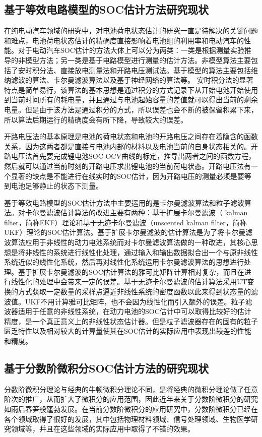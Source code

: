 	\subsection{基于等效电路模型的SOC估计方法研究现状}
	在纯电动汽车领域的研究中，对电池荷电状态估计的研究一直是待解决的关键问题和难点，电池荷电状态估计的精确度直接影响着电池组的利用率和电动汽车的性能。对于电动汽车SOC估计的方法大体上可以分为两类：一类是根据测量实验推导的非模型方法；另一类是基于电路模型进行测量的估计方法。非模型算法主要包括了安时积分法、直接放电测量法和开路电压测试法。基于模型的算法主要包括维纳滤波的算法、卡尔曼滤波算法以及基于神经网络的算法等。
安时积分法的显著特点是简单易行，该算法的基本思想是通过积分的方式记录下从开始电池开始使用到当前时间所有的耗电量，并且通过与电池起始容量的差值就可以得出当前的剩余电量。但是由于该方法是通过积分的方式，所以误差也会不断的被保留积累下来，所以算法后期运行的精确度会有所下降，导致较大的误差。

开路电压法的基本原理是电池的荷电状态和电池的开路电压之间存在着隐含的函数关系，因为这两者都是直接与电池内部的材料以及电池当前的自身状态相关的。开路电压法首先要完成锂电池SOC-OCV曲线的标定，推导出两者之间的函数方程，然后就可以通过当前时刻的开路电压求出锂电池的当前荷电状态。开路电压法有一个显著的缺点是不能进行在线实时的SOC估计，因为开路电压的测量必须是要等到电池足够静止的状态下测量。

	基于等效电路模型的SOC估计方法中主要运用的是卡尔曼滤波算法和粒子滤波算法。对卡尔曼滤波估计算法的改进主要有两种：基于扩展卡尔曼滤波（ kalman filter，简称EKF）理论和基于无迹卡尔曼滤波（unscented kalman filter，简称UKF）理论的SOC估计算法。基于扩展卡尔曼滤波的估计算法是为了将卡尔曼滤波算法应用于非线性的动力电池系统而对卡尔曼滤波算法做的一种改进，其核心思想是将非线性的系统进行线性化处理，通过输入和输出数据拟合出一个与原非线性系统近似的线性化系统，然后再对线性化系统运用卡尔曼滤波算法的思想进行处理。基于扩展卡尔曼滤波的SOC估计算法的雅可比矩阵计算相对复杂，而且在进行线性化的处理中会带来一定的误差。基于无迹卡尔曼滤波的估计算法采用UT变换的方式获取一定数量的采样点逼近非线性系统的密度函数以此来得到状态量的滤波值。UKF不用计算雅可比矩阵，也不会因为线性化而引入额外的误差。粒子滤波器适用于任意的非线性系统，在动力电池的SOC估计中可以取得比较好的估计精度，是一个真正意义上的非线性状态估计器。但是粒子滤波器存在的固有的粒子匮乏特性以及相对较大的计算量使其在SOC估计的实际应用中表现出较差的性能和精度。
	\subsection{基于分数阶微积分SOC估计方法的研究现状}
	分数阶微积分理论与经典的牛顿微积分理论不同，是将经典的微积分理论做了任意阶次的推广，从而扩大了微积分的应用范围，因此近年来关于分数阶微积分的研究如雨后春笋般蓬勃发展。在当前分数阶微积分的应用研究中，分数阶微积分已经在各个领域取得了很好的发展，其中包括物理材料领域、信号处理领域、生物医学研究领域等，并且在这些领域的实际应用中取得了不错的效果。

